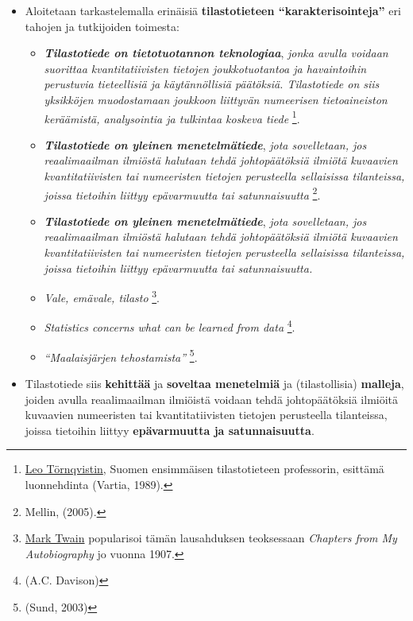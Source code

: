 \documentclass[
]{book}
\providecommand{\tightlist}{%
  \setlength{\itemsep}{0pt}\setlength{\parskip}{0pt}}
\begin{document}
\begin{itemize}
\tightlist
\item
  Aloitetaan tarkastelemalla erinäisiä \textbf{tilastotieteen ``karakterisointeja''} eri tahojen ja tutkijoiden toimesta:

  \begin{itemize}
  \tightlist
  \item
    \textbf{\emph{Tilastotiede on tietotuotannon teknologiaa}}, \emph{jonka avulla voidaan suorittaa kvantitatiivisten tietojen joukkotuotantoa ja havaintoihin perustuvia tieteellisiä ja käytännöllisiä päätöksiä. Tilastotiede on siis yksikköjen muodostamaan joukkoon liittyvän numeerisen tietoaineiston keräämistä, analysointia ja tulkintaa koskeva tiede} \footnote{\href{https://fi.wikipedia.org/wiki/Leo_T\%C3\%B6rnqvist}{Leo Törnqvistin}, Suomen ensimmäisen tilastotieteen professorin, esittämä luonnehdinta (Vartia, 1989).}.
  \item
    \textbf{\emph{Tilastotiede on yleinen menetelmätiede}}, \emph{jota sovelletaan, jos reaalimaailman ilmiöstä halutaan tehdä johtopäätöksiä ilmiötä kuvaavien kvantitatiivisten tai numeeristen tietojen perusteella sellaisissa tilanteissa, joissa tietoihin liittyy epävarmuutta tai satunnaisuutta} \footnote{Mellin, (2005).}.
  \item
    \textbf{\emph{Tilastotiede on yleinen menetelmätiede}}, \emph{jota sovelletaan, jos reaalimaailman ilmiöstä halutaan tehdä johtopäätöksiä ilmiötä kuvaavien kvantitatiivisten tai numeeristen tietojen perusteella sellaisissa tilanteissa, joissa tietoihin liittyy epävarmuutta tai satunnaisuutta.}
  \item
    \emph{Vale, emävale, tilasto} \footnote{\href{https://fi.wikipedia.org/wiki/Mark_Twain}{Mark Twain} popularisoi tämän lausahduksen teoksessaan \emph{Chapters from My Autobiography} jo vuonna 1907.}.
  \item
    \emph{Statistics concerns what can be learned from data} \footnote{(A.C. Davison)}.
  \item
    \emph{``Maalaisjärjen tehostamista''} \footnote{(Sund, 2003)}.
  \end{itemize}
\item
  Tilastotiede siis \textbf{kehittää} ja \textbf{soveltaa menetelmiä} ja (tilastollisia) \textbf{malleja}, joiden avulla reaalimaailman ilmiöistä voidaan tehdä johtopäätöksiä ilmiöitä kuvaavien numeeristen tai kvantitatiivisten tietojen perusteella tilanteissa, joissa tietoihin liittyy \textbf{epävarmuutta ja satunnaisuutta}.


\end{itemize}
\end{document}
